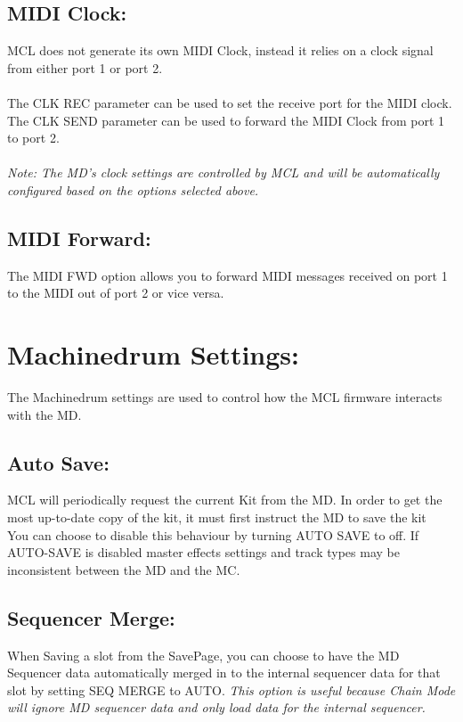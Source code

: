 \subsection{MIDI Clock:}
MCL does not generate its own MIDI Clock, instead it relies on a clock signal from either port 1 or port 2.\\\\
The CLK REC parameter can be used to set the receive port for the MIDI clock.\\
The CLK SEND parameter can be used to forward the MIDI Clock from port 1 to port 2.\\\\
\textit{Note: The MD's clock settings are controlled by MCL and will be automatically configured based on the options selected above.}

\subsection{MIDI Forward:}
The MIDI FWD option allows you to forward MIDI messages received on port 1 to the MIDI out of port 2 or vice versa.

\section{Machinedrum Settings:}
The Machinedrum settings are used to control how the MCL firmware interacts with the MD.
\\
\subsection{Auto Save:}
MCL will periodically request the current Kit from the MD. In order to get the most up-to-date copy of the kit, it must first instruct the MD to save the kit
\\
You can choose to disable this behaviour by turning AUTO SAVE to off. If AUTO-SAVE is disabled master effects settings and track types may be inconsistent between the MD and the MC.

\subsection{Sequencer Merge:}
When Saving a slot from the SavePage, you can choose to have the MD Sequencer data automatically merged in to the internal sequencer data for that slot by setting SEQ MERGE to AUTO.
\textit{This option is useful because Chain Mode will ignore MD sequencer data and only load data for the internal sequencer.}
